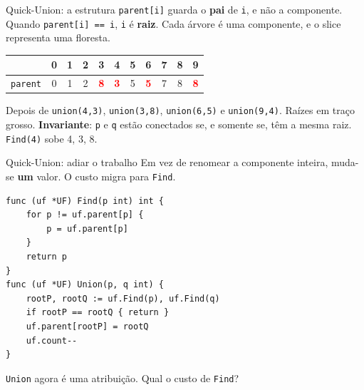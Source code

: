 \documentclass{beamer}
\newcommand{\hl}[1]{\textcolor{red}{\textbf{#1}}}
\begin{document}
\begin{frame}{Quick-Union: a estrutura}
	\texttt{parent[i]} guarda o \textbf{pai} de \texttt{i}, e não a componente.
	Quando \texttt{parent[i] == i}, \texttt{i} é \textbf{raiz}. Cada árvore é
	uma componente, e o slice representa uma floresta.

	\vspace{0.3cm}
	\begin{center}
		\small
		\setlength{\tabcolsep}{4pt}
		\begin{tabular}{@{}l|cccccccccc@{}}
			\toprule
			                & 0 & 1 & 2 & 3      & 4      & 5 & 6      & 7 & 8      & 9      \\
			\midrule
			\texttt{parent} & 0 & 1 & 2 & \hl{8} & \hl{3} & 5 & \hl{5} & 7 & 8      & \hl{8} \\
			\bottomrule
		\end{tabular}
	\end{center}

	\vspace{0.2cm}
	\begin{center}
	\end{center}

	\vspace{0.1cm}
	\footnotesize Depois de \texttt{union(4,3)}, \texttt{union(3,8)},
	\texttt{union(6,5)} e \texttt{union(9,4)}. Raízes em traço grosso.
	\textbf{Invariante}: \texttt{p} e \texttt{q} estão conectados se, e somente
	se, têm a mesma raiz. \texttt{Find(4)} sobe 4, 3, 8.
\end{frame}

\begin{frame}[fragile]{Quick-Union: adiar o trabalho}
	Em vez de renomear a componente inteira, muda-se \textbf{um} valor. O custo
	migra para \texttt{Find}.

	\begin{verbatim}
func (uf *UF) Find(p int) int {
    for p != uf.parent[p] {
        p = uf.parent[p]
    }
    return p
}
func (uf *UF) Union(p, q int) {
    rootP, rootQ := uf.Find(p), uf.Find(q)
    if rootP == rootQ { return }
    uf.parent[rootP] = rootQ
    uf.count--
}
  \end{verbatim}

	\begin{center}
		\Large \texttt{Union} agora é uma atribuição. Qual o custo de \texttt{Find}?
	\end{center}
\end{frame}
\end{document}
